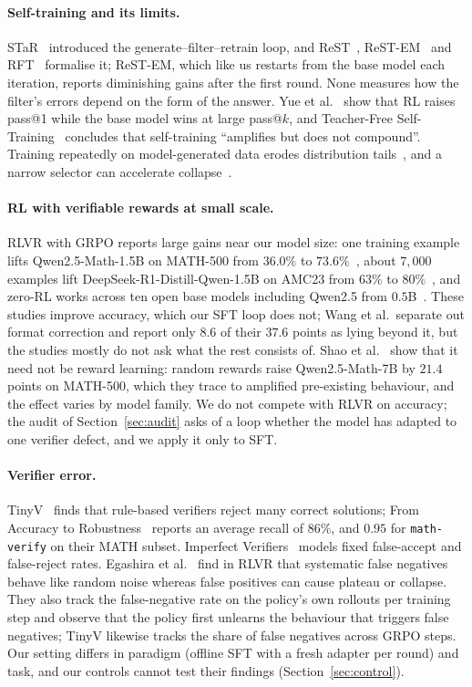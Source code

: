 \documentclass[runningheads]{llncs}
\begin{document}
\paragraph{Self-training and its limits.}
STaR~\cite{ref_star} introduced the generate--filter--retrain loop, and
ReST~\cite{ref_rest}, ReST-EM~\cite{ref_restem} and RFT~\cite{ref_rft} formalise
it; ReST-EM, which like us restarts from the base model each iteration, reports
diminishing gains after the first round. None measures how the filter's errors
depend on the form of the answer. Yue et al.~\cite{ref_rllimit} show that RL
raises pass@1 while the base model wins at large pass@$k$, and Teacher-Free
Self-Training~\cite{ref_teacherfree} concludes that self-training ``amplifies but
does not compound''. Training repeatedly on model-generated data erodes
distribution tails~\cite{ref_collapse}, and a narrow selector can accelerate
collapse~\cite{ref_selectionbias}.

\paragraph{RL with verifiable rewards at small scale.}
RLVR with GRPO reports large gains near our model size: one training example
lifts Qwen2.5-Math-1.5B on MATH-500 from $36.0\%$ to $73.6\%$~\cite{ref_oneshot},
about $7{,}000$ examples lift DeepSeek-R1-Distill-Qwen-1.5B on AMC23 from $63\%$
to $80\%$~\cite{ref_openrs}, and zero-RL works across ten open base models
including Qwen2.5 from $0.5$B~\cite{ref_simplerl}. These studies improve
accuracy, which our SFT loop does not; Wang et al.\ separate out format correction and report
only $8.6$ of their $37.6$ points as lying beyond it, but the studies mostly do
not ask what the rest consists of. Shao et al.~\cite{ref_spurious} show that it need not be
reward learning: random rewards raise Qwen2.5-Math-7B by $21.4$ points on
MATH-500, which they trace to amplified pre-existing behaviour, and the effect
varies by model family. We do not compete with RLVR on accuracy; the audit of
Section~\ref{sec:audit} asks of a loop whether the model has adapted to one
verifier defect, and we apply it only to SFT.

\paragraph{Verifier error.}
TinyV~\cite{ref_tinyv} finds that rule-based verifiers reject many correct
solutions; From Accuracy to Robustness~\cite{ref_robustness} reports an average
recall of $86\%$, and $0.95$ for \texttt{math-verify} on their MATH subset.
Imperfect Verifiers~\cite{ref_imperfect} models fixed false-accept and
false-reject rates. Egashira et al.~\cite{ref_delayplateau} find in RLVR that
systematic false negatives behave like random noise whereas false positives can
cause plateau or collapse. They also track the false-negative rate on the
policy's own rollouts per training step and observe that the policy first
unlearns the behaviour that triggers false negatives; TinyV likewise tracks
the share of false negatives across GRPO steps. Our setting differs in
paradigm (offline SFT with a fresh adapter per round) and task, and our
controls cannot test their findings (Section~\ref{sec:control}).
\end{document}
